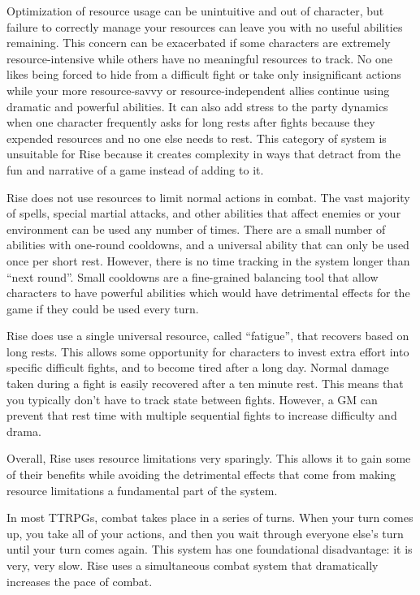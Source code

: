     Optimization of resource usage can be unintuitive and out of character, but failure to correctly manage your resources can leave you with no useful abilities remaining.
    This concern can be exacerbated if some characters are extremely resource-intensive while others have no meaningful resources to track.
    No one likes being forced to hide from a difficult fight or take only insignificant actions while your more resource-savvy or resource-independent allies continue using dramatic and powerful abilities.
    It can also add stress to the party dynamics when one character frequently asks for long rests after fights because they expended resources and no one else needs to rest.
    This category of system is unsuitable for Rise because it creates complexity in ways that detract from the fun and narrative of a game instead of adding to it.

    Rise does not use resources to limit normal actions in combat.
    The vast majority of spells, special martial attacks, and other abilities that affect enemies or your environment can be used any number of times.
    There are a small number of abilities with one-round cooldowns, and a universal ability that can only be used once per short rest.
    However, there is no time tracking in the system longer than ``next round''.
    Small cooldowns are a fine-grained balancing tool that allow characters to have powerful abilities which would have detrimental effects for the game if they could be used every turn.

    Rise does use a single universal resource, called ``fatigue'', that recovers based on long rests.
    This allows some opportunity for characters to invest extra effort into specific difficult fights, and to become tired after a long day.
    Normal damage taken during a fight is easily recovered after a ten minute rest.
    This means that you typically don't have to track state between fights.
    However, a GM can prevent that rest time with multiple sequential fights to increase difficulty and drama.

    Overall, Rise uses resource limitations very sparingly.
    This allows it to gain some of their benefits while avoiding the detrimental effects that come from making resource limitations a fundamental part of the system.

    In most TTRPGs, combat takes place in a series of turns.
    When your turn comes up, you take all of your actions, and then you wait through everyone else's turn until your turn comes again.
    This system has one foundational disadvantage: it is very, very slow.
    Rise uses a simultaneous combat system that dramatically increases the pace of combat.

